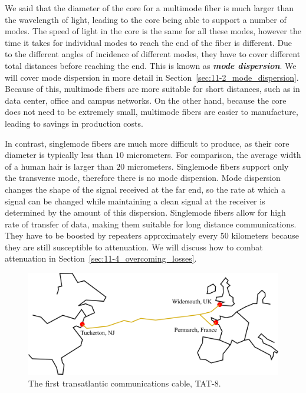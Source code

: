 We said that the diameter of the core for a multimode fiber is much larger than the wavelength of light, leading to the core being able to support a number of modes.
The speed of light in the core is the same for all these modes, however the time it takes for individual modes to reach the end of the fiber is different.
Due to the different angles of incidence of different modes, they have to cover different total distances before reaching the end.
This is known as \textit{\textbf{mode dispersion}}.
We will cover mode dispersion in more detail in Section~\ref{sec:11-2_mode_dispersion}.
Because of this, multimode fibers are more suitable for short distances, such as in data center, office and campus networks.
On the other hand, because the core does not need to be extremely small, multimode fibers are easier to manufacture, leading to savings in production costs.

In contrast, singlemode fibers are much more difficult to produce, as their core diameter is typically less than $10$ micrometers.
For comparison, the average width of a human hair is larger than $20$ micrometers.
Singlemode fibers support only the transverse mode, therefore there is no mode dispersion.
Mode dispersion changes the shape of the signal received at the far end, so the rate at which a signal can be changed while maintaining a clean signal at the receiver is determined by the amount of this dispersion.
Singlemode fibers allow for high rate of transfer of data, making them suitable for long distance communications.
They have to be boosted by repeaters approximately every 50 kilometers because they are still susceptible to attenuation.
We will discuss how to combat attenuation in Section~\ref{sec:11-4_overcoming_losses}.

\begin{figure}[t]
    \centering
    \includegraphics[width=\textwidth]{lesson7/7-4_TAT8.pdf}
    \caption[TAT-8]{The first transatlantic communications cable, TAT-8.}
    \label{fig:7-4_TAT8}
\end{figure}

